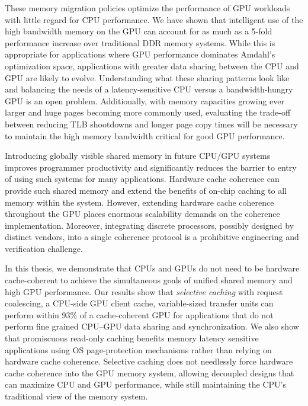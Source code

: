 These memory migration policies optimize the performance of GPU workloads with
little regard for CPU performance.  We have shown that intelligent use of the
high bandwidth memory on the GPU can account for as much as a 5-fold performance
increase over traditional DDR memory systems.  While this is appropriate for
applications where GPU performance dominates Amdahl's optimization space,
applications with greater data sharing between the CPU and GPU are likely to
evolve.  Understanding what these sharing patterns look like and
balancing the needs of a latency-sensitive CPU versus a bandwidth-hungry GPU is
an open problem. Additionally, with memory capacities growing ever larger and
huge pages becoming more commonly used, evaluating the trade-off between
reducing TLB shootdowns and longer page copy times will be necessary to maintain
the high memory bandwidth critical for good GPU performance.

Introducing globally visible shared memory in future CPU/GPU systems improves
programmer productivity and significantly reduces the barrier to entry of using
such systems for many applications.  Hardware cache coherence can provide such
shared memory and extend the benefits of on-chip caching to all memory within
the system.  However, extending hardware cache coherence throughout the GPU
places enormous scalability demands on the coherence implementation.  Moreover,
integrating discrete processors, possibly designed by distinct vendors, into a
single coherence protocol is a prohibitive engineering and verification
challenge.  

In this thesis, we demonstrate that CPUs and GPUs do not need to be hardware
cache-coherent to achieve the simultaneous goals of unified shared memory and
high GPU performance.  Our results show that \textit{selective caching} with
request coalescing, a CPU-side GPU client cache, variable-sized transfer units
can perform within 93\% of a cache-coherent GPU for applications that do not
perform fine grained CPU--GPU data sharing and synchronization. We also show
that promiscuous read-only caching benefits memory latency sensitive
applications using OS page-protection mechanisms rather than relying on hardware
cache coherence.  Selective caching does not needlessly force hardware cache
coherence into the GPU memory system, allowing decoupled designs that can
maximize CPU and GPU performance, while still maintaining the CPU's traditional
view of the memory system.
